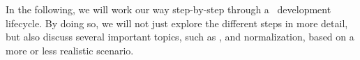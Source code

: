In the following, we will work our way step-by-step through a \db\ development lifecycle.
By doing so, we will not just explore the different steps in more detail, but also discuss several important topics, such as , and normalization, based on a more or less realistic scenario.%
%
\endhsection%
\endhsection%
%
